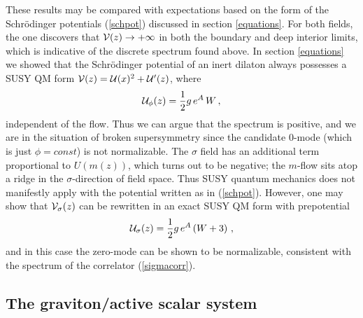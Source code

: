 \documentclass[a4paper,12pt]{article}
\begin{document}
These results may be compared with expectations based on the form of
the Schr\"odinger potentials (\ref{schpot}) discussed in section
\ref{equations}.  For both fields, the one discovers that ${\cal V}(z)
\rightarrow + \infty$ in both the boundary and deep interior limits,
which is indicative of the discrete spectrum found above.  In section
\ref{equations} we showed that the Schr\"odinger potential of an inert
dilaton always possesses a SUSY QM form ${\cal V}(z) = {\cal U}(x)^2 +
{\cal U}'(z)$, where
\begin{eqnarray}
\label{universaldil}
{\cal U}_{\phi}(z) = \frac{1}{2} g \, e^A \, W \,,
\end{eqnarray}
independent of the flow.  Thus we can argue that the spectrum is
positive, and we are in the situation of broken supersymmetry since
the candidate 0-mode (which is just $\phi = const$) is not
normalizable.  The $\sigma$ field has an additional term proportional
to $U(m(z))$, which turns out to be negative; the $m$-flow sits atop a
ridge in the $\sigma$-direction of field space.  Thus SUSY quantum
mechanics does not manifestly apply with the potential written as in
(\ref{schpot}).  However, one may show that ${\cal V}_{\sigma}(z)$ can
be rewritten in an exact SUSY QM form with prepotential
\begin{eqnarray}
\label{symsigmasusypot}
{\cal U}_{\sigma}(z) = \frac{1}{2} g \, e^A \left( W + 3 \right) \,,
\end{eqnarray}
and in this case the zero-mode can be shown to be normalizable, consistent
with the spectrum of the correlator (\ref{sigmacorr}).


\subsection{The graviton/active scalar system}
\end{document}
